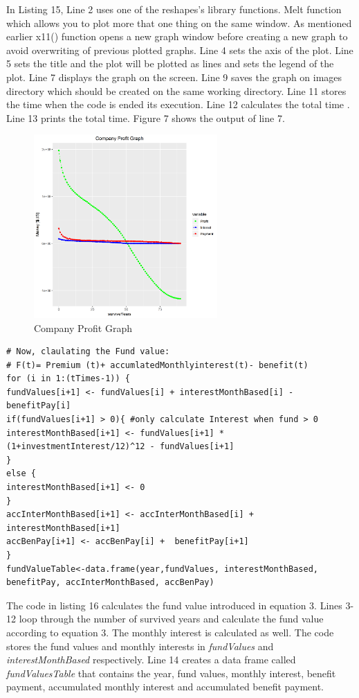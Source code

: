 \documentclass[12pt]{article}
\begin{document}
In Listing 15, Line 2 uses one of the reshapes's library functions. Melt function which allows you to plot more that one thing on the same window. As mentioned earlier x11() function opens a new graph window before creating a new graph to avoid overwriting of previous plotted graphs. Line 4 sets the axis of the plot. Line 5 sets the title and the plot will be plotted as lines and sets the legend of the plot. Line 7 displays the graph on the screen. Line 9 saves the graph on images directory which should be created on the same working directory. Line 11 stores the time when the code is ended its execution. Line 12 calculates the total time . Line 13 prints the total time. Figure 7 shows the output of line 7.
\clearpage
\begin{figure}[h]
	\centering
	\includegraphics[width=0.7\linewidth, height=7cm]{S7.png}
	\caption{Company Profit Graph}

\end{figure}
\begin{lstlisting}[caption={Calculating The Fund Value},captionpos=b]
# Now, claulating the Fund value:
# F(t)= Premium (t)+ accumlatedMonthlyinterest(t)- benefit(t)
for (i in 1:(tTimes-1)) {
fundValues[i+1] <- fundValues[i] + interestMonthBased[i] - benefitPay[i]
if(fundValues[i+1] > 0){ #only calculate Interest when fund > 0
interestMonthBased[i+1] <- fundValues[i+1] * (1+investmentInterest/12)^12 - fundValues[i+1] 
}
else {
interestMonthBased[i+1] <- 0
}
accInterMonthBased[i+1] <- accInterMonthBased[i] +  interestMonthBased[i+1]
accBenPay[i+1] <- accBenPay[i] +  benefitPay[i+1]
}
fundValueTable<-data.frame(year,fundValues, interestMonthBased, benefitPay, accInterMonthBased, accBenPay)
\end{lstlisting}
\pagebreak
The code in listing 16 calculates the fund value introduced in equation 3. Lines 3-12 loop through the number of survived years and calculate the fund value according to equation 3.  The monthly interest is calculated as well. The code stores the fund values and monthly interests in \textit{fundValues} and \textit{interestMonthBased} respectively. Line 14 creates a data frame called \textit{fundValuesTable} that contains the year, fund values, monthly interest, benefit payment, accumulated monthly interest and accumulated benefit payment.
\end{document}
